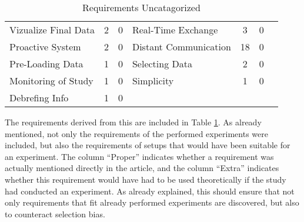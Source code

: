 \begin{table}[htbp]
\begin{tabular}{lcclccc}
    Vizualize Final Data                                       & 2                          & 0                         & Real-Time Exchange                                         & 3                          & 0                         \\
    Proactive System                                           & 2                          & 0                         & Distant Communication                                      & 18                         & 0                         \\
    Pre-Loading Data                                           & 1                          & 0                         & Selecting Data                                              & 2                          & 0                         \\
    Monitoring of Study                                        & 1                          & 0                         & Simplicity                                                  & 1                          & 0                         \\
    Debrefing Info                                             & 1                          & 0                         & & & & \\\hline
    \end{tabular}
    \caption[Requirements Uncatagorized]{Requirements Uncatagorized}\label{tab:requirementsRaw1}
    \end{table}


The requirements derived from this are included in Table \ref{tab:requirementsRaw1}. As already mentioned, not only the requirements of the performed experiments were included, but also the requirements of setups that would have been suitable for an experiment. The column \enquote{Proper} indicates whether a requirement was actually mentioned directly in the article, and the column \enquote{Extra} indicates whether this requirement would have had to be used theoretically if the study had conducted an experiment. As already explained, this should ensure that not only requirements that fit already performed experiments are discovered, but also to counteract selection bias.




